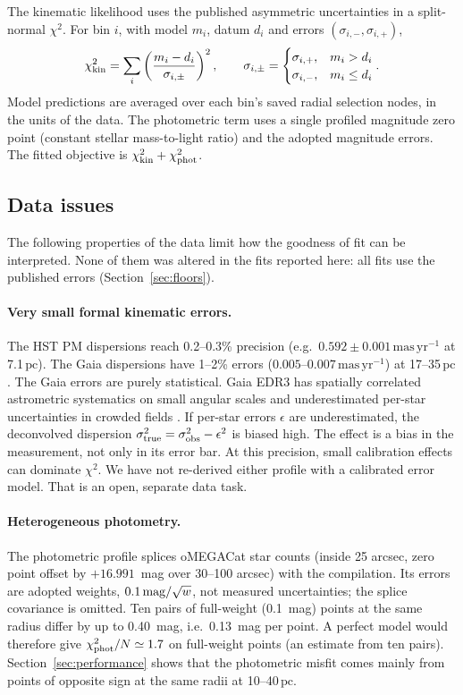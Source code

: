 \documentclass[11pt,a4paper]{article}
\newcommand{\pc}{\ensuremath{\,\mathrm{pc}}\xspace}
\newcommand{\masyr}{\ensuremath{\,\mathrm{mas\,yr^{-1}}}\xspace}
\newcommand{\chikin}{\ensuremath{\chi^2_{\rm kin}}\xspace}
\begin{document}
The kinematic likelihood uses the published asymmetric uncertainties in a
split-normal $\chi^2$. For bin $i$, with model $m_i$, datum $d_i$ and errors
$(\sigma_{i,-},\sigma_{i,+})$,
\begin{equation}
 \chikin=\sum_i\left(\frac{m_i-d_i}{\sigma_{i,\pm}}\right)^2,
 \qquad \sigma_{i,\pm}=\begin{cases}\sigma_{i,+}, & m_i>d_i\\ \sigma_{i,-}, & m_i\le d_i\end{cases}.
 \label{eq:chi2}
\end{equation}
Model predictions are averaged over each bin's saved radial selection
nodes, in the units of the data. The photometric term uses a single profiled
magnitude zero point (constant stellar mass-to-light ratio) and the adopted
magnitude errors. The fitted objective is
$\chikin+\chi^2_{\rm phot}$.

\subsection{Data issues}
\label{sec:data-issues}

The following properties of the data limit how the goodness of fit can be
interpreted. None of them was altered in the fits reported here: all fits use
the published errors (Section~\ref{sec:floors}).

\paragraph{Very small formal kinematic errors.}
The HST PM dispersions reach 0.2--0.3\% precision (e.g.\
$0.592\pm0.001\masyr$ at 7.1\pc). The Gaia dispersions have 1--2\% errors
($0.005$--$0.007\masyr$) at 17--35\pc. The Gaia errors are purely statistical.
Gaia EDR3 has spatially correlated astrometric systematics on small angular
scales and underestimated per-star uncertainties in crowded fields
\citep{2021A&A...649A...2L,2021MNRAS.505.5978V}. If per-star errors
$\epsilon$ are underestimated, the deconvolved dispersion
$\sigma^2_{\rm true}=\sigma^2_{\rm obs}-\epsilon^2$ is biased high. The
effect is a bias in the measurement, not only in its error bar. At this
precision, small calibration effects can dominate $\chi^2$. We have not
re-derived either profile with a calibrated error model. That is an open,
separate data task.

\paragraph{Heterogeneous photometry.}
The photometric profile splices oMEGACat star counts (inside 25 arcsec,
zero point offset by $+16.991$~mag over 30--100 arcsec) with the
\citet{1995AJ....109..218T} compilation. Its errors are adopted weights,
$0.1\,{\rm mag}/\sqrt{w}$, not measured uncertainties; the splice covariance
is omitted. Ten pairs of full-weight (0.1~mag) points at the same radius
differ by up to 0.40~mag, i.e.\ 0.13~mag per point. A perfect model would
therefore give $\chi^2_{\rm phot}/N\simeq1.7$ on full-weight points (an
estimate from ten pairs). Section~\ref{sec:performance} shows that the
photometric misfit comes mainly from points of opposite sign at the same
radii at 10--40\pc.
\end{document}
